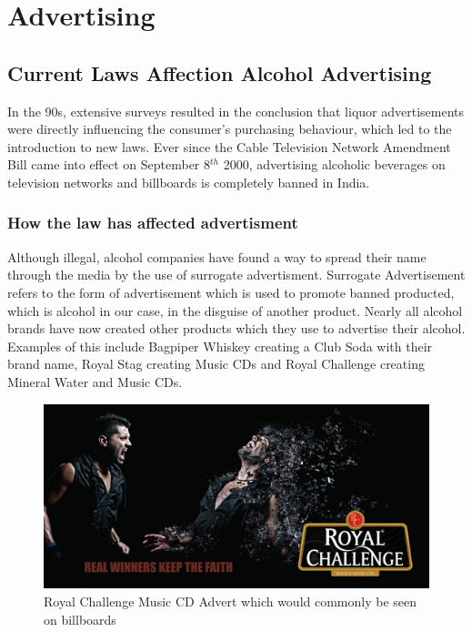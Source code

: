 \documentclass{article}
\begin{document}
\section{Advertising}
\subsection{Current Laws Affection Alcohol Advertising}
In the 90s, extensive surveys resulted in the conclusion that liquor advertisements
were directly influencing the consumer's purchasing behaviour, which led to the 
introduction to new laws. Ever since the Cable Television Network Amendment Bill 
came into effect on September 8$^{th}$ 2000, advertising alcoholic beverages on 
television networks and billboards is completely banned in India. 

\subsubsection{How the law has affected advertisment}
Although illegal, alcohol companies have found a way to spread their name through
the media by the use of surrogate advertisment. Surrogate Advertisement refers
to the form of advertisement which is used to promote banned producted, which is
alcohol in our case, in the disguise of another product. 
Nearly all alcohol brands have now created other products which they use to advertise
their alcohol. Examples of this include Bagpiper Whiskey creating a Club Soda with
their brand name, Royal Stag creating Music CDs and Royal Challenge creating Mineral
Water and Music CDs.

\begin{figure}[h!]
	\caption{Royal Challenge Music CD Advert which would commonly be seen on billboards}
	\centering
		\includegraphics[width=\textwidth]{rcad1.jpg}
\end{figure}
\end{document}
